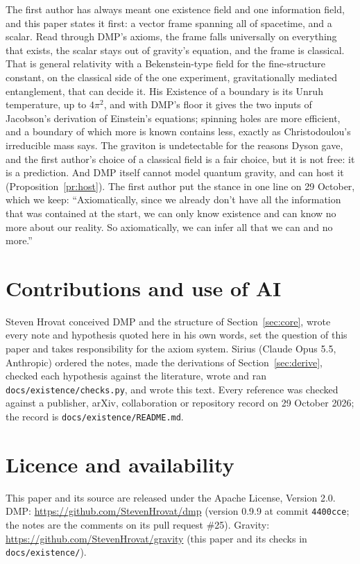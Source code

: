 \documentclass[11pt,a4paper]{article}
\theoremstyle{definition}
\theoremstyle{remark}
\begin{document}
The first author has always meant one existence field and one information field, and this paper states it first: a vector frame
spanning all of spacetime, and a scalar. Read through DMP's axioms, the frame falls universally on everything that exists, the scalar
stays out of gravity's equation, and the frame is classical. That is general relativity with a Bekenstein-type field for the fine-structure
constant, on the classical side of the one experiment, gravitationally mediated entanglement, that can decide it. His Existence of a
boundary is its Unruh temperature, up to $4\pi^2$, and with DMP's floor it gives the two inputs of Jacobson's derivation of Einstein's
equations; spinning holes are more efficient, and a boundary of which more is known contains less, exactly as Christodoulou's irreducible
mass says. The graviton is undetectable for the reasons Dyson gave, and the first author's choice of a classical field is a fair choice,
but it is not free: it is a prediction. And DMP itself cannot model quantum gravity, and can host it (Proposition~\ref{pr:host}). The first author put
the stance in one line on 29 October, which we keep: ``Axiomatically, since we already don't have all the information that was contained
at the start, we can only know existence and can know no more about our reality. So axiomatically, we can infer all that we can and no
more.''

\section*{Contributions and use of AI}
Steven Hrovat conceived DMP and the structure of Section~\ref{sec:core}, wrote every note and hypothesis quoted here in his own words, set
the question of this paper and takes responsibility for the axiom system. Sirius (Claude Opus 5.5, Anthropic) ordered the notes, made the
derivations of Section~\ref{sec:derive}, checked each hypothesis against the literature, wrote and ran \texttt{docs/existence/checks.py},
and wrote this text. Every reference was checked against a publisher, arXiv, collaboration or repository record on 29 October 2026; the
record is \texttt{docs/existence/README.md}.

\section*{Licence and availability}
This paper and its source are released under the Apache License, Version 2.0. DMP: \url{https://github.com/StevenHrovat/dmp} (version 0.9.9
at commit \texttt{4400cce}; the notes are the comments on its pull request \#25). Gravity: \url{https://github.com/StevenHrovat/gravity}
(this paper and its checks in \texttt{docs/existence/}).
\end{document}
